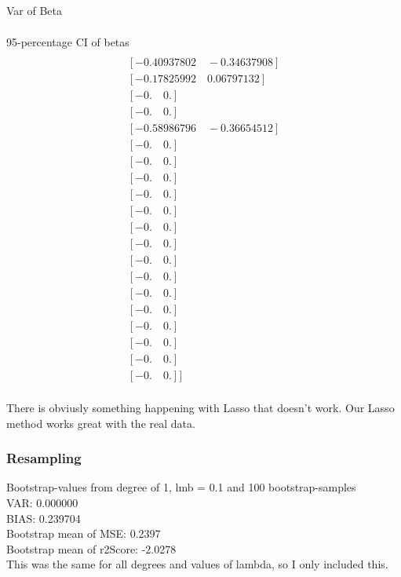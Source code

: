 \documentclass[a4paper,norsk]{article}
\begin{document}
Var of Beta
\begin{align*}
[ 0.   \quad       0.00025829 \quad 0.00394575\quad  0.     \quad     0.    \quad      0.00324571\\
  0.      \quad    0.     \quad     0.    \quad      0.    \quad      0.     \quad     0.    \quad      0.\\
  0.     \quad     0.   \quad       0.      \quad    0.     \quad     0.     \quad     0.   \quad       0.\\
  0.        ]
\end{align*}

95-percentage CI of betas
\begin{align*}
[[ 0.      \quad    0.        ]\\
 [-0.40937802\quad -0.34637908]\\
 [-0.17825992\quad  0.06797132]\\
 [-0.      \quad    0.        ]\\
 [-0.   \quad       0.        ]\\
 [-0.58986796\quad -0.36654512]\\
 [-0.    \quad      0.        ]\\
 [-0.   \quad       0.        ]\\
 [-0.    \quad      0.        ]\\
 [-0.   \quad       0.        ]\\
 [-0.     \quad     0.        ]\\
 [-0.     \quad     0.        ]\\
 [-0.   \quad       0.        ]\\
 [-0.    \quad      0.        ]\\
 [-0.    \quad      0.        ]\\
 [-0.    \quad      0.        ]\\
 [-0.     \quad     0.        ]\\
 [-0.    \quad      0.        ]\\
 [-0.    \quad      0.        ]\\
 [-0.   \quad       0.        ]\\
 [-0.    \quad      0.        ]]
\end{align*}
\\There is obviusly something happening with Lasso that doesn't work. Our Lasso method works great with the real data.
\subsubsection{Resampling}
Bootstrap-values from degree of 1, lmb = 0.1 and 100 bootstrap-samples
\\VAR: 0.000000
\\BIAS: 0.239704
\\Bootstrap mean of MSE: 0.2397
\\Bootstrap mean of r2Score: -2.0278
\\This was the same for all degrees and values of lambda, so I only included this.
\clearpage
\end{document}
